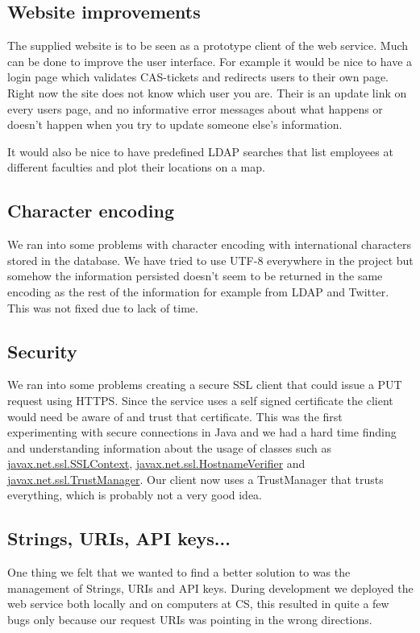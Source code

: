 \documentclass[titlepage, twocolumn, a4paper, 10pt]{article}
\begin{document}
\subsection{Website improvements}
The supplied website is to be seen as a prototype client of the web service. Much can be done to improve the user interface. For example it would be nice to have a login page which validates CAS-tickets and redirects users to their own page. Right now the site does not know which user you are. Their is an update link on every users page, and no informative error messages about what happens or doesn't happen when you try to update someone else's information.

It would also be nice to have predefined LDAP searches that list employees at different faculties and plot their locations on a map.

\subsection{Character encoding}
We ran into some problems with character encoding with international characters stored in the database. We have tried to use UTF-8 everywhere in the project but somehow the information persisted doesn't seem to be returned in the same encoding as the rest of the information for example from LDAP and Twitter. This was not fixed due to lack of time.

\subsection{Security}\label{sec:security}
We ran into some problems creating a secure SSL client that could issue a PUT request using HTTPS. Since the service uses a self signed certificate the client would need be aware of and trust that certificate. This was the first experimenting with secure connections in Java and we had a hard time finding and understanding information about the usage of classes such as \url{javax.net.ssl.SSLContext}, \url{javax.net.ssl.HostnameVerifier} and \url{javax.net.ssl.TrustManager}. Our client now uses a TrustManager that trusts everything, which is probably not a very good idea.

\subsection{Strings, URIs, API keys...}
One thing we felt that we wanted to find a better solution
to was the management of Strings, URIs and API keys.
During development we deployed the web service both
locally and on computers at CS, this resulted in quite a
few bugs only because our request URIs was pointing
in the wrong directions.
\end{document}
